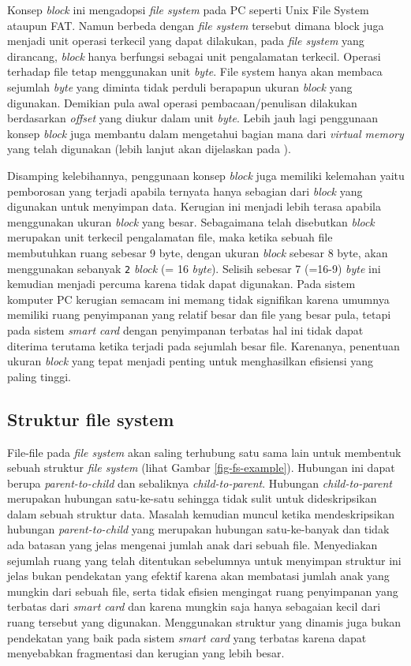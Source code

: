 Konsep {\em block} ini mengadopsi {\em file system} pada PC seperti Unix File System ataupun FAT. Namun berbeda dengan {\em file system} tersebut dimana block juga menjadi unit operasi terkecil yang dapat dilakukan, pada {\em file system} yang dirancang, {\em block} hanya berfungsi sebagai unit pengalamatan terkecil. Operasi terhadap file tetap menggunakan unit {\em byte}. File system hanya akan membaca sejumlah {\em byte} yang diminta tidak perduli berapapun ukuran {\em block} yang digunakan. Demikian pula awal operasi pembacaan/penulisan dilakukan berdasarkan {\em offset} yang diukur dalam unit {\em byte}. Lebih jauh lagi penggunaan konsep {\em block} juga membantu dalam mengetahui bagian mana dari {\em virtual memory} yang telah digunakan (lebih lanjut akan dijelaskan pada ).

Disamping kelebihannya, penggunaan konsep {\em block} juga memiliki kelemahan yaitu pemborosan yang terjadi apabila ternyata hanya sebagian dari {\em block} yang digunakan untuk menyimpan data. Kerugian ini menjadi lebih terasa apabila menggunakan ukuran {\em block} yang besar. Sebagaimana telah disebutkan {\em block} merupakan unit terkecil pengalamatan file, maka ketika sebuah file membutuhkan ruang sebesar 9 byte, dengan ukuran {\em block} sebesar 8 byte, akan menggunakan sebanyak {\tt 2} {\em block} (= 16 {\em byte}). Selisih sebesar 7 (=16-9) {\em byte} ini kemudian menjadi percuma karena tidak dapat digunakan. Pada sistem komputer PC kerugian semacam ini memang tidak signifikan karena umumnya memiliki ruang penyimpanan yang relatif besar dan file yang besar pula, tetapi pada sistem \textsl{smart card} dengan penyimpanan terbatas hal ini tidak dapat diterima terutama ketika terjadi pada sejumlah besar file. Karenanya, penentuan ukuran {\em block} yang tepat menjadi penting untuk menghasilkan efisiensi yang paling tinggi.

\subsection{Struktur file system}
\label{fs-structure}

File-file pada {\em file system} akan saling terhubung satu sama lain untuk membentuk sebuah struktur {\em file system}  (lihat Gambar \ref{fig-fs-example}). Hubungan ini dapat berupa {\em parent-to-child} dan sebaliknya {\em child-to-parent}. Hubungan {\em child-to-parent} merupakan hubungan satu-ke-satu sehingga tidak sulit untuk dideskripsikan dalam sebuah struktur data. Masalah kemudian muncul ketika mendeskripsikan hubungan {\em parent-to-child} yang merupakan hubungan satu-ke-banyak dan tidak ada batasan yang jelas mengenai jumlah anak dari sebuah file. Menyediakan sejumlah ruang yang telah ditentukan sebelumnya untuk menyimpan struktur ini jelas bukan pendekatan yang efektif karena akan membatasi jumlah anak yang mungkin dari sebuah file, serta tidak efisien mengingat ruang penyimpanan yang terbatas dari \textsl{smart card} dan karena mungkin saja hanya sebagaian kecil dari ruang tersebut yang digunakan. Menggunakan struktur yang dinamis juga bukan pendekatan yang baik pada sistem \textsl{smart card} yang terbatas karena dapat menyebabkan fragmentasi dan kerugian yang lebih besar. 


